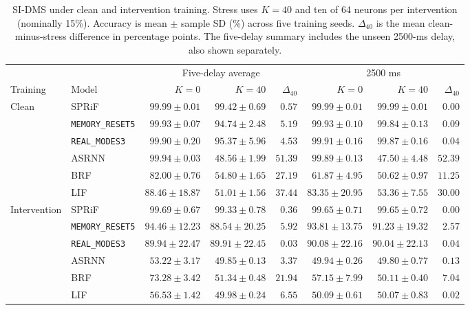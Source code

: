 \documentclass[letterpaper,journal]{IEEEtran}
\newcommand{\mr}{\textnormal{\texttt{MEMORY\_RESET5}}}
\newcommand{\rmodes}{\textnormal{\texttt{REAL\_MODES3}}}
\begin{document}
\begin{table}[t]
\caption{SI-DMS under clean and intervention training. Stress uses $K=40$ and ten of 64 neurons per intervention (nominally 15\%). Accuracy is mean $\pm$ sample SD (\%) across five training seeds. $\Delta_{40}$ is the mean clean-minus-stress difference in percentage points. The five-delay summary includes the unseen 2500-ms delay, also shown separately.}
\label{tab:sidms_results}
\centering\footnotesize\setlength{\tabcolsep}{4pt}
\begin{tabular}{@{}llrrrrrr@{}}
\toprule
& & \multicolumn{3}{c}{Five-delay average} & \multicolumn{3}{c}{2500 ms}\\
\cmidrule(lr){3-5}\cmidrule(l){6-8}
Training & Model & $K=0$ & $K=40$ & $\Delta_{40}$ & $K=0$ & $K=40$ & $\Delta_{40}$\\
\midrule
Clean & SPRiF & $99.99\pm0.01$ & $99.42\pm0.69$ & $0.57$ & $99.99\pm0.01$ & $99.99\pm0.01$ & $0.00$\\
 & \mr & $99.93\pm0.07$ & $94.74\pm2.48$ & $5.19$ & $99.93\pm0.10$ & $99.84\pm0.13$ & $0.09$\\
 & \rmodes & $99.90\pm0.20$ & $95.37\pm5.96$ & $4.53$ & $99.91\pm0.16$ & $99.87\pm0.16$ & $0.04$\\
 & ASRNN & $99.94\pm0.03$ & $48.56\pm1.99$ & $51.39$ & $99.89\pm0.13$ & $47.50\pm4.48$ & $52.39$\\
 & BRF & $82.00\pm0.76$ & $54.80\pm1.65$ & $27.19$ & $61.87\pm4.95$ & $50.62\pm0.97$ & $11.25$\\
 & LIF & $88.46\pm18.87$ & $51.01\pm1.56$ & $37.44$ & $83.35\pm20.95$ & $53.36\pm7.55$ & $30.00$\\
\midrule
Intervention & SPRiF & $99.69\pm0.67$ & $99.33\pm0.78$ & $0.36$ & $99.65\pm0.71$ & $99.65\pm0.72$ & $0.00$\\
 & \mr & $94.46\pm12.23$ & $88.54\pm20.25$ & $5.92$ & $93.81\pm13.75$ & $91.23\pm19.32$ & $2.57$\\
 & \rmodes & $89.94\pm22.47$ & $89.91\pm22.45$ & $0.03$ & $90.08\pm22.16$ & $90.04\pm22.13$ & $0.04$\\
 & ASRNN & $53.22\pm3.17$ & $49.85\pm0.13$ & $3.37$ & $49.94\pm0.26$ & $49.80\pm0.77$ & $0.13$\\
 & BRF & $73.28\pm3.42$ & $51.34\pm0.48$ & $21.94$ & $57.15\pm7.99$ & $50.11\pm0.40$ & $7.04$\\
 & LIF & $56.53\pm1.42$ & $49.98\pm0.24$ & $6.55$ & $50.09\pm0.61$ & $50.07\pm0.83$ & $0.02$\\
\bottomrule
\end{tabular}
\end{table}
\end{document}
